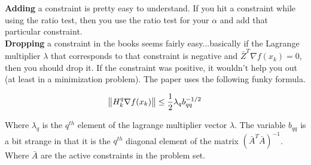 \documentclass{article}
\begin{document}
\textbf{Adding} a constraint is pretty easy to understand. If you hit a constraint while using the ratio test, then you use the ratio test for your $\alpha$ and add that particular constraint. \\

\textbf{Dropping} a constraint in the books seems fairly easy...basically if the Lagrange multiplier $\lambda$ that corresponds to that constraint is negative and $\bar{Z}^{T} \nabla f (x_{k}) = 0$, then you should drop it. If the constraint was positive, it wouldn't help you out (at least in a minimization problem). The paper uses the following funky formula.

$$\norm{H_k^q \nabla f(x_k)} \leq \dfrac{1}{2}\lambda_q b_{qq}^{-1/2}$$

Where $\lambda_q$ is the $q^{th}$ element of the lagrange multiplier vector $\lambda$. The variable $b_{qq}$ is a bit strange in that it is the $q^{th}$ diagonal element of the matrix $(\bar{A}^{T}\bar{A})^{-1}$. Where $\bar{A}$ are the active constraints in the problem set.


\printbibliography
\end{document}
